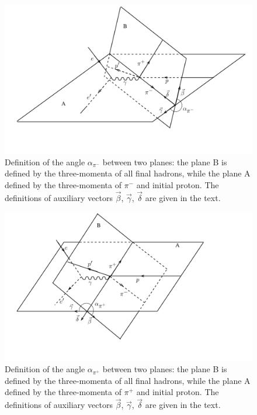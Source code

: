 \begin{figure}[htp]
\begin{center}
\includegraphics[width=12cm]{pictures/cross_sction/angles/alpha1.pdf}
\caption{\small Definition of the angle $\alpha_{\pi^{-}}$ between two planes: the plane B is defined by the three-momenta of all final hadrons, while the plane A defined by  the three-momenta of $\pi^{-}$ and initial proton. The definitions of  auxiliary vectors $\vec \beta$, $\vec \gamma$, $\vec \delta$ are given in the text.} \label{fig:cr_sec_kinematic2}
\end{center}
\end{figure}



\begin{figure}[htp]
\begin{center}
\includegraphics[width=12cm]{pictures/cross_sction/angles/alpha3.pdf}
\caption{\small Definition of the angle $\alpha_{\pi^{+}}$ between two planes: the plane B is defined by the three-momenta of all final hadrons, while the plane A defined by  the three-momenta of $\pi^{+}$ and initial proton. The definitions of  auxiliary vectors $\vec \beta$, $\vec \gamma$, $\vec \delta$ are given in the text.} \label{fig:cr_sec_kinematic3}
\end{center}
\end{figure}

